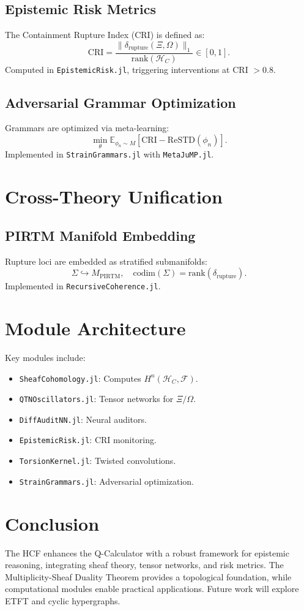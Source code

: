 \documentclass[12pt]{article}
\newcommand{\rank}{\text{rank}}
\begin{document}
\subsection{Epistemic Risk Metrics}
The Containment Rupture Index (CRI) is defined as:
\[
\text{CRI} = \frac{\|\delta_{\text{rupture}}(\Xi, \Omega)\|_1}{\rank(\mathcal{H}_C)} \in [0,1].
\]
Computed in \texttt{EpistemicRisk.jl}, triggering interventions at CRI \(> 0.8\).

\subsection{Adversarial Grammar Optimization}
Grammars are optimized via meta-learning:
\[
\min_\theta \mathbb{E}_{\phi_n \sim M} [\text{CRI} - \text{ReSTD}(\phi_n)].
\]
Implemented in \texttt{StrainGrammars.jl} with \texttt{MetaJuMP.jl}.

\section{Cross-Theory Unification}
\subsection{PIRTM Manifold Embedding}
Rupture loci are embedded as stratified submanifolds:
\[
\Sigma \hookrightarrow M_{\text{PIRTM}}, \quad \text{codim}(\Sigma) = \rank(\delta_{\text{rupture}}).
\]
Implemented in \texttt{RecursiveCoherence.jl}.

\section{Module Architecture}
Key modules include:
\begin{itemize}
    \item \texttt{SheafCohomology.jl}: Computes \(H^n(\mathcal{H}_C, \mathcal{F})\).
    \item \texttt{QTNOscillators.jl}: Tensor networks for \(\Xi/\Omega\).
    \item \texttt{DiffAuditNN.jl}: Neural auditors.
    \item \texttt{EpistemicRisk.jl}: CRI monitoring.
    \item \texttt{TorsionKernel.jl}: Twisted convolutions.
    \item \texttt{StrainGrammars.jl}: Adversarial optimization.
\end{itemize}

\section{Conclusion}
The HCF enhances the Q-Calculator with a robust framework for epistemic reasoning, integrating sheaf theory, tensor networks, and risk metrics. The Multiplicity-Sheaf Duality Theorem provides a topological foundation, while computational modules enable practical applications. Future work will explore ETFT and cyclic hypergraphs.
\end{document}
